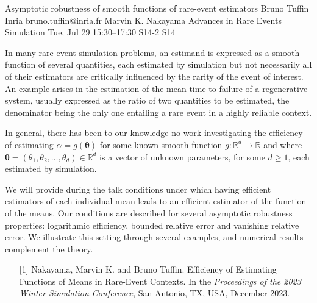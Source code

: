 \begin{talk}
  {Asymptotic robustness of  smooth functions of  rare-event estimators}%
  {Bruno Tuffin}%
  {Inria}%
  {bruno.tuffin@inria.fr}%
  {Marvin K. Nakayama}%
  {Advances in Rare Events Simulation}%
  {Tue, Jul 29 15:30–17:30}%
  {S14-2}%
  {S14}%
				
			
In many rare-event simulation problems, an estimand is expressed  as a smooth function of several quantities,  each
estimated by simulation  but not necessarily all of their estimators are critically influenced by
the rarity of the event of interest.  
An example arises in the estimation of the mean time to failure of a regenerative system, usually expressed as the ratio of two quantities to be estimated, the denominator being the only one  entailing a rare event in a highly reliable context.

In general, there has been to our knowledge no work investigating  the efficiency  of estimating $\alpha = g({\boldsymbol{\theta}})$
for some known  smooth function $g : \mathbb{R}^d \to \mathbb{R}$ and where ${\boldsymbol{\theta}} = (\theta_1, \theta_2, \ldots, \theta_d) \in \mathbb{R}^d$ is a vector of unknown parameters, for some $d \geq 1$, each  estimated by simulation.

We will provide during the talk conditions under which having efficient estimators of each individual mean leads to an efficient estimator of the function of the means. Our conditions are described for several asymptotic robustness properties: logarithmic efficiency, bounded relative error and vanishing relative error.
We illustrate this setting through several examples, and numerical results complement the theory.


			

\medskip


\begin{enumerate}
	\item[{[1]}]  Nakayama, Marvin K. and Bruno Tuffin.  Efficiency of Estimating Functions of Means in Rare-Event Contexts. In the {\it Proceedings of the 2023 Winter Simulation Conference}, San Antonio, TX, USA, December 2023.
\end{enumerate}

\end{talk}


